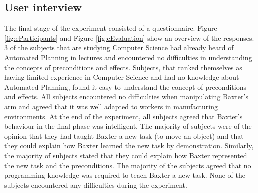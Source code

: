 \subsection{User interview}
The final stage of the experiment consisted of a questionnaire. Figure \ref{fig:eParticipants} and Figure \ref{fig:eEvaluation} show an overview of the responses.
3 of the subjects that are studying Computer Science had already heard of Automated Planning in lectures and encountered no difficulties in understanding the concepts of preconditions and effects.
Subjects, that ranked themselves as having limited experience in Computer Science and had no knowledge about Automated Planning, found it easy to understand the concept of preconditions and effects.
All subjects encountered no difficulties when manipulating Baxter's arm and agreed that it was well adapted to workers in manufacturing environments.
At the end of the experiment, all subjects agreed that Baxter's behaviour in the final phase was intelligent. The majority of subjects were of the opinion that they had taught Baxter a new task (to move an object) and that they could explain how Baxter learned the new task by demonstration. Similarly, the majority of subjects stated that they could explain how Baxter represented the new task and the preconditions.
The majority of the subjects agreed that no programming knowledge was required to teach Baxter a new task. None of the subjects encountered any difficulties during the experiment.

